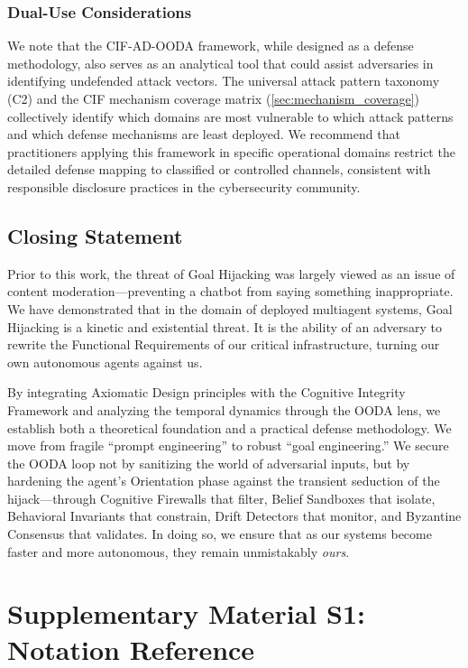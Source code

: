 \documentclass[
]{article}
\begin{document}
\subsubsection{Dual-Use Considerations}\label{dual-use-considerations}

We note that the CIF-AD-OODA framework, while designed as a defense
methodology, also serves as an analytical tool that could assist
adversaries in identifying undefended attack vectors. The universal
attack pattern taxonomy (C2) and the CIF mechanism coverage matrix
(\cref{sec:mechanism_coverage}) collectively identify which domains are
most vulnerable to which attack patterns and which defense mechanisms
are least deployed. We recommend that practitioners applying this
framework in specific operational domains restrict the detailed defense
mapping to classified or controlled channels, consistent with
responsible disclosure practices in the cybersecurity community.

\subsection{Closing Statement}\label{closing-statement}

Prior to this work, the threat of Goal Hijacking was largely viewed as
an issue of content moderation---preventing a chatbot from saying
something inappropriate. We have demonstrated that in the domain of
deployed multiagent systems, Goal Hijacking is a kinetic and existential
threat. It is the ability of an adversary to rewrite the Functional
Requirements of our critical infrastructure, turning our own autonomous
agents against us.

By integrating Axiomatic Design principles with the Cognitive Integrity
Framework and analyzing the temporal dynamics through the OODA lens, we
establish both a theoretical foundation and a practical defense
methodology. We move from fragile ``prompt engineering'' to robust
``goal engineering.'' We secure the OODA loop not by sanitizing the
world of adversarial inputs, but by hardening the agent's Orientation
phase against the transient seduction of the hijack---through Cognitive
Firewalls that filter, Belief Sandboxes that isolate, Behavioral
Invariants that constrain, Drift Detectors that monitor, and Byzantine
Consensus that validates. In doing so, we ensure that as our systems
become faster and more autonomous, they remain unmistakably \emph{ours}.

\newpage

\section{Supplementary Material S1: Notation
Reference}\label{supplementary-material-s1-notation-reference}
\end{document}
